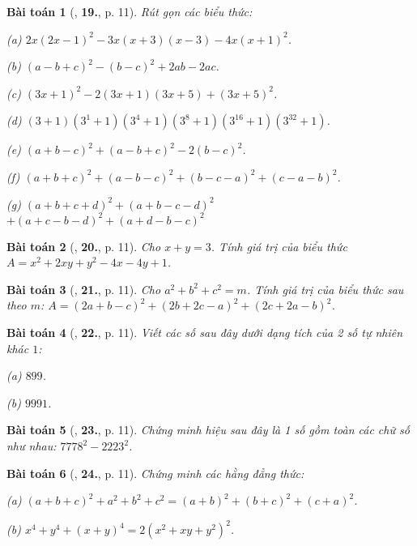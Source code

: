 \documentclass{article}
\numberwithin{equation}{section}
\newtheorem{baitoan}{Bài toán}[section]
\begin{document}
\begin{baitoan}[\cite{Binh_Toan_8_tap_1}, \textbf{19.}, p. 11]
	Rút gọn các biểu thức:
	\begin{enumerate*}
		\item[(a)] $2x(2x - 1)^2 - 3x(x + 3)(x - 3) - 4x(x + 1)^2$.
		\item[(b)] $(a - b + c)^2  - (b - c)^2 + 2ab - 2ac$.
		\item[(c)] $(3x + 1)^2 - 2(3x + 1)(3x + 5) + (3x + 5)^2$.
		\item[(d)] $(3 + 1)(3^1 + 1)(3^4 + 1)(3^8 + 1)(3^{16} + 1)(3^{32} + 1)$.
		\item[(e)] $(a + b - c)^2 + (a - b + c)^2 - 2(b - c)^2$.
		\item[(f)] $(a + b + c)^2 + (a - b - c)^2 + (b - c - a)^2 + (c - a - b)^2$.
		\item[(g)] $(a + b + c + d)^2 + (a + b - c - d)^2$ $+ (a + c - b - d)^2 + (a + d - b - c)^2$
	\end{enumerate*}
\end{baitoan}

\begin{baitoan}[\cite{Binh_Toan_8_tap_1}, \textbf{20.}, p. 11]
	Cho $x + y = 3$. Tính giá trị của biểu thức $A = x^2 + 2xy + y^2 - 4x - 4y + 1$.
\end{baitoan}

\begin{baitoan}[\cite{Binh_Toan_8_tap_1}, \textbf{21.}, p. 11]
	Cho $a^2 + b^2 + c^2 = m$. Tính giá trị của biểu thức sau theo $m$: $A = (2a + b - c)^2 + (2b + 2c - a)^2 + (2c + 2a - b)^2$.
\end{baitoan}

\begin{baitoan}[\cite{Binh_Toan_8_tap_1}, \textbf{22.}, p. 11]
	Viết các số sau đây dưới dạng tích của 2 số tự nhiên khác $1$:
	\begin{enumerate*}
		\item[(a)] $899$.
		\item[(b)] $9991$.
	\end{enumerate*}
\end{baitoan}

\begin{baitoan}[\cite{Binh_Toan_8_tap_1}, \textbf{23.}, p. 11]
	Chứng minh hiệu sau đây là 1 số gồm toàn các chữ số như nhau: $7778^2 - 2223^2$.
\end{baitoan}

\begin{baitoan}[\cite{Binh_Toan_8_tap_1}, \textbf{24.}, p. 11]
	Chứng minh các hằng đẳng thức:
	\begin{enumerate*}
		\item[(a)] $(a + b + c)^2 + a^2 + b^2 + c^2 = (a + b)^2 + (b + c)^2 + (c + a)^2$.
		\item[(b)] $x^4 + y^4 + (x + y)^4 = 2(x^2 + xy + y^2)^2$.
	\end{enumerate*}
\end{baitoan}
\end{document}
